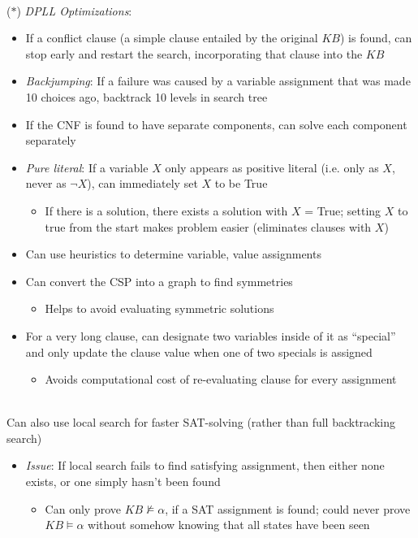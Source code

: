 \documentclass[12pt]{extarticle}
\theoremstyle{definition}
\theoremstyle{remark}
\newcommand{\pstart}[0]{\noindent}
\newcommand{\newp}[0]{~\\ \pstart}
\begin{document}
\newp
($\ast$) \textit{DPLL Optimizations}: \begin{itemize}
    \item If a conflict clause (a simple clause entailed by the original $KB$) is found, can stop early and restart the search, incorporating that clause into the $KB$
    \item \textit{Backjumping}: If a failure was caused by a variable assignment that was made 10 choices ago, backtrack 10 levels in search tree
    \item If the CNF is found to have separate components, can solve each component separately
    \item \textit{Pure literal}: If a variable $X$ only appears as positive literal (i.e. only as $X$, never as $\neg X$), can immediately set $X$ to be True \begin{itemize}
        \item If there is a solution, there exists a solution with $X$ = True; setting $X$ to true from the start makes problem easier (eliminates clauses with $X$)
    \end{itemize}
    \item Can use heuristics to determine variable, value assignments
    \item Can convert the CSP into a graph to find symmetries \begin{itemize}
        \item Helps to avoid evaluating symmetric solutions
    \end{itemize}
    \item For a very long clause, can designate two variables inside of it as ``special'' and only update the clause value when one of two specials is assigned \begin{itemize}
        \item Avoids computational cost of re-evaluating clause for every assignment
    \end{itemize}
\end{itemize}

\newp
Can also use local search for faster SAT-solving (rather than full backtracking search) \begin{itemize}
    \item \textit{Issue}: If local search fails to find satisfying assignment, then either none exists, or one simply hasn't been found \begin{itemize}
        \item Can only prove $KB\not\models\alpha$, if a SAT assignment is found; could never prove $KB\models\alpha$ without somehow knowing that all states have been seen
    \end{itemize}
\end{itemize}
\end{document}

